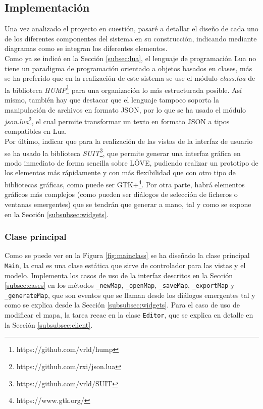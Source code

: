 \subsection{Implementación}

Una vez analizado el proyecto en cuestión, pasaré a detallar el diseño de cada uno de los diferentes componentes del sistema en su construcción, indicando mediante diagramas como se integran los diferentes elementos. \\

Como ya se indicó en la Sección \ref{subsec:lua}, el lenguaje de programación Lua no tiene un paradigma de programación orientado a objetos basados en clases, más se ha preferido que en la realización de este sistema se use el módulo \textit{class.lua} de la biblioteca \textit{HUMP}\footnote{https://github.com/vrld/hump} para una organización lo más estructurada posible. Así mismo, también hay que destacar que el lenguaje tampoco soporta la manipulación de archivos en formato JSON, por lo que se ha usado el módulo \textit{json.lua}\footnote{https://github.com/rxi/json.lua}, el cual permite transformar un texto en formato JSON a tipos compatibles en Lua. \\

Por último, indicar que para la realización de las vistas de la interfaz de usuario se ha usado la biblioteca \textit{SUIT}\footnote{https://github.com/vrld/SUIT}, que permite generar una interfaz gráfica en modo inmediato de forma sencilla sobre LÖVE, pudiendo realizar un prototipo de los elementos más rápidamente y con más flexibilidad que con otro tipo de bibliotecas gráficas, como puede ser GTK+\footnote{https://www.gtk.org/}. Por otra parte, habrá elementos gráficos más complejos (como pueden ser diálogos de selección de ficheros o ventanas emergentes) que se tendrán que generar a mano, tal y como se expone en la Sección \ref{subsubsec:widgets}.

\subsubsection{Clase principal}
\label{subsubsec:main}

Como se puede ver en la Figura \ref{fig:mainclass} se ha diseñado la clase principal \texttt{Main}, la cual es una clase estática que sirve de controlador para las vistas y el modelo. Implementa los casos de uso de la interfaz descritos en la Sección \ref{subsec:cases} en los métodos \texttt{\_newMap}, \texttt{\_openMap}, \texttt{\_saveMap}, \texttt{\_exportMap} y \texttt{\_generateMap}, que son eventos que se llaman desde los diálogos emergentes tal y como se explica desde la Sección \ref{subsubsec:widgets}. Para el caso de uso de modificar el mapa, la tarea recae en la clase \texttt{Editor}, que se explica en detalle en la Sección \ref{subsubsec:client}. \\

